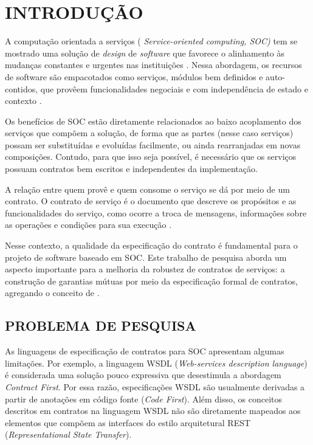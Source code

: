 

\chapter{INTRODUÇÃO}
\vspace{-6mm}

A computação orientada a serviços ( \emph{Service-oriented computing, SOC)} tem
se mostrado uma solução de \textit{design} de \textit{software} que favorece o
alinhamento às mudanças constantes e urgentes nas instituições
\cite{chen2008towards}. Nessa abordagem, os recursos de software são empacotados
como serviços, módulos bem definidos e auto-contidos, que provêem
funcionalidades negociais e com independência de estado e contexto
\cite{papazoglou2007service}.

Os benefícios de SOC estão diretamente relacionados ao
baixo acoplamento dos serviços que compõem a solução, de forma que as partes
(nesse caso serviços) possam ser substituídas e evoluídas facilmente, ou ainda
rearranjadas em novas composições. Contudo, para que isso seja possível, é
necessário que os serviços possuam contratos bem escritos e independentes da
implementação.

A relação entre quem provê e quem consome o serviço se
dá por meio de um contrato. O contrato de serviço é o documento que descreve os
propósitos e as funcionalidades do serviço, como ocorre a troca de mensagens,
informações sobre as operações e condições para sua execução \cite{erl2009web}.

Nesse contexto, a qualidade da especificação do contrato é fundamental para o
projeto de software baseado em SOC. Este trabalho de pesquisa aborda um aspecto
importante para a melhoria da robustez de contratos de serviços: a construção de
garantias mútuas por meio da especificação formal de contratos, agregando o
conceito de \designbycontract{}.

\section{PROBLEMA DE PESQUISA}
\vspace{-6mm}

As linguagens de especificação de contratos para SOC apresentam
algumas limitações. Por exemplo, a linguagem WSDL (\emph{Web-services
description language}) \cite{WSDLSite} é considerada uma solução
pouco expressiva que desestimula a abordagem \textit{Contract First}. Por essa
razão, especificações WSDL são usualmente derivadas a partir de anotações em código
fonte (\textit{Code First}).
Além disso, os conceitos descritos em contratos na linguagem WSDL não são
diretamente mapeados aos elementos que compõem as interfaces do estilo
arquitetural REST\cite{fielding2000architectural} (\emph{Representational State Transfer}).

